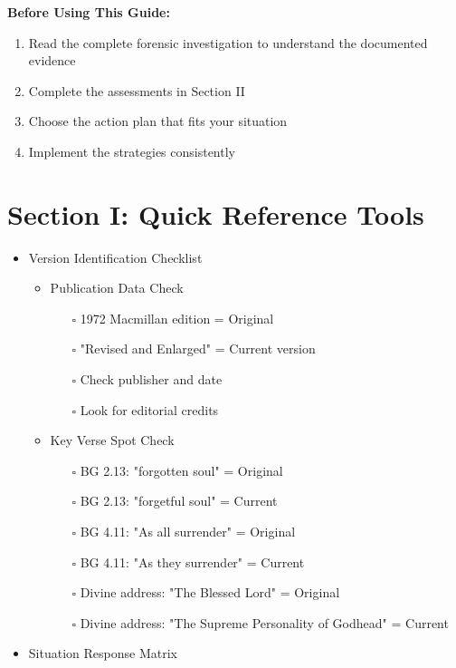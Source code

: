 \documentclass[11pt,twoside]{book}
\begin{document}
\textbf{\textbf{Before Using This Guide:}}
\begin{enumerate}
\item Read the complete forensic investigation to understand the documented evidence
\item Complete the assessments in Section II
\item Choose the action plan that fits your situation
\item Implement the strategies consistently
\end{enumerate}
\section*{Section I: Quick Reference Tools}
\label{sec:org30b82cf}

\begin{itemize}
\item Version Identification Checklist
\label{sec:org52b5972}

\begin{itemize}
\item Publication Data Check
\label{sec:org7638f0c}
\begin{itemize}
\item[{$\square$}] 1972 Macmillan edition = Original
\item[{$\square$}] "Revised and Enlarged" = Current version
\item[{$\square$}] Check publisher and date
\item[{$\square$}] Look for editorial credits
\end{itemize}
\item Key Verse Spot Check
\label{sec:org14633b6}
\begin{itemize}
\item[{$\square$}] BG 2.13: "forgotten soul" = Original
\item[{$\square$}] BG 2.13: "forgetful soul" = Current
\item[{$\square$}] BG 4.11: "As all surrender" = Original
\item[{$\square$}] BG 4.11: "As they surrender" = Current
\item[{$\square$}] Divine address: "The Blessed Lord" = Original
\item[{$\square$}] Divine address: "The Supreme Personality of Godhead" = Current
\end{itemize}
\end{itemize}
\item Situation Response Matrix
\label{sec:org167a531}


\end{itemize}
\end{document}
